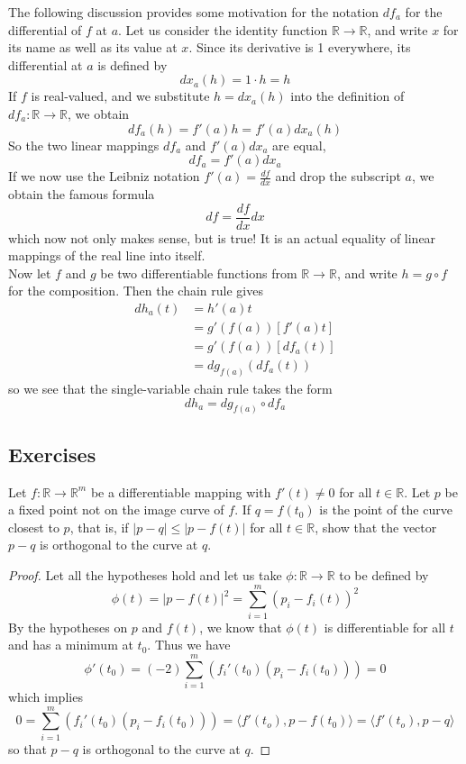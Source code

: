 The following discussion provides some motivation for the notation \( df_a \) for the differential of \( f \) at \( a \). Let us consider the identity function \( \mathbb{R} \rightarrow \mathbb{R} \), and write \( x \) for its name as well as its value at \( x \). Since its derivative is 1 everywhere, its differential at \( a \) is defined by
\[
dx_a(h) = 1\cdot h = h
\]
If \( f \) is real-valued, and we substitute \( h = dx_a(h) \) into the definition of \( df_a: \mathbb{R} \rightarrow \mathbb{R} \), we obtain
\[
df_a(h) = f'(a)h = f'(a)dx_a(h)
\]
So the two linear mappings \( df_a \) and \( f'(a)dx_a \) are equal,
\[
df_a = f'(a)dx_a
\]
If we now use the Leibniz notation \( f'(a) = \frac{df}{dx} \) and drop the subscript \( a \), we obtain the famous formula
\[
df = \frac{df}{dx}dx
\]
which now not only makes sense, but is true! It is an actual equality of linear mappings of the real line into itself.
\\

Now let \(f \) and \( g \) be two differentiable functions from \( \mathbb{R} \rightarrow \mathbb{R} \), and write \( h = g \circ f \) for the composition. Then the chain rule gives
\begin{align*}
    dh_a(t) &= h'(a)t \\
    &= g'(f(a))[f'(a)t] \\
    &= g'(f(a))[df_a(t)] \\
    &= dg_{f(a)}(df_a(t))
\end{align*}
so we see that the single-variable chain rule takes the form
\[
dh_a = dg_{f(a)} \circ df_a
\]

\subsection*{Exercises}
\question Let \( f:\mathbb{R} \rightarrow \mathbb{R}^m \) be a differentiable mapping with \( f'(t) \neq 0 \) for all \( t \in \mathbb{R} \). Let \( p \) be a fixed point not on the image curve of \( f \). If \( q = f(t_0) \) is the point of the curve closest to \( p \), that is, if \( \left| p-q \right| \leq \left| p - f(t) \right| \) for all \( t \in \mathbb{R} \), show that the vector \( p-q \) is orthogonal to the curve at \( q \).

\begin{proof}
Let all the hypotheses hold and let us take \( \phi: \mathbb{R} \rightarrow \mathbb{R} \) to be defined by
\[
\phi(t) = \left| p-f(t) \right|^2 = \sum_{i=1}^m \left( p_i-f_i(t) \right)^2
\]
By the hypotheses on \( p \) and \( f(t) \), we know that \( \phi(t) \) is differentiable for all \( t \) and has a minimum at \( t_0 \). Thus we have
\[
\phi'(t_0) = (-2)\sum_{i=1}^m \left( f_i'(t_0)(p_i-f_i(t_0)) \right) = 0
\]
which implies
\[
0 = \sum_{i=1}^m \left( f_i'(t_0)(p_i-f_i(t_0)) \right) = \langle f'(t_o), p-f(t_0) \rangle = \langle f'(t_o), p-q \rangle
\]
so that \( p-q \) is orthogonal to the curve at \( q \).
\end{proof}

